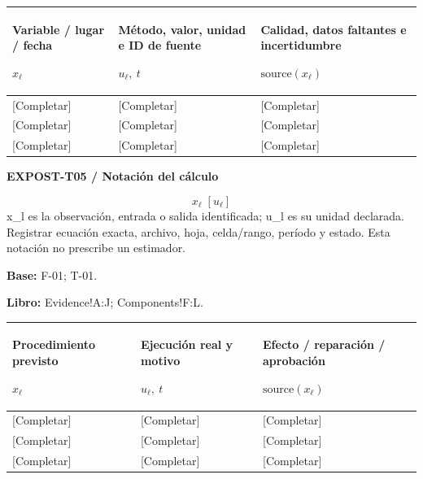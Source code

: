 {\sffamily\fontsize{8.3}{10.3}\selectfont\begin{longtable}{@{}P{54.83mm} P{54.83mm} P{54.83mm}@{}}
\toprule
\textbf{Variable / lugar / fecha}\par {\normalfont\fontsize{8.2}{10}\selectfont $x_{\ell}$} & \textbf{Método, valor, unidad e ID de fuente}\par {\normalfont\fontsize{8.2}{10}\selectfont $u_{\ell},\ t$} & \textbf{Calidad, datos faltantes e incertidumbre}\par {\normalfont\fontsize{8.2}{10}\selectfont $\text{source}(x_{\ell})$}\\\midrule\endhead
\rule{0pt}{8mm}[Completar] & [Completar] & [Completar]\\\hline
\rule{0pt}{8mm}[Completar] & [Completar] & [Completar]\\\hline
\rule{0pt}{8mm}[Completar] & [Completar] & [Completar]\\\hline
\end{longtable}}
\par\begingroup\sffamily\fontsize{8}{10}\selectfont\color{NEBGreen}\setlength{\parskip}{2pt}\setlength{\abovedisplayskip}{4pt}\setlength{\belowdisplayskip}{4pt}\setlength{\abovedisplayshortskip}{2pt}\setlength{\belowdisplayshortskip}{3pt}
\textbf{EXPOST-T05 / Notación del cálculo}\par
{\fontsize{9}{11}\selectfont\[ x_{\ell}\;[u_{\ell}] \]}
x\_l es la observación, entrada o salida identificada; u\_l es su unidad declarada. Registrar ecuación exacta, archivo, hoja, celda/rango, período y estado. Esta notación no prescribe un estimador.\par
\textbf{Base:} F-01; T-01.\par
\textbf{Libro:} Evidence!A:J; Components!F:L.\par\endgroup
{\sffamily\fontsize{8.3}{10.3}\selectfont\begin{longtable}{@{}P{54.83mm} P{54.83mm} P{54.83mm}@{}}
\toprule
\textbf{Procedimiento previsto}\par {\normalfont\fontsize{8.2}{10}\selectfont $x_{\ell}$} & \textbf{Ejecución real y motivo}\par {\normalfont\fontsize{8.2}{10}\selectfont $u_{\ell},\ t$} & \textbf{Efecto / reparación / aprobación}\par {\normalfont\fontsize{8.2}{10}\selectfont $\text{source}(x_{\ell})$}\\\midrule\endhead
\rule{0pt}{8mm}[Completar] & [Completar] & [Completar]\\\hline
\rule{0pt}{8mm}[Completar] & [Completar] & [Completar]\\\hline
\rule{0pt}{8mm}[Completar] & [Completar] & [Completar]\\\hline
\end{longtable}}
